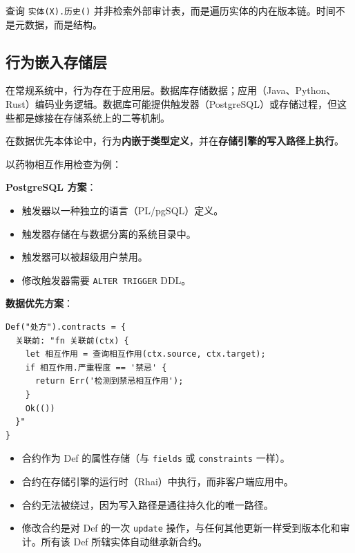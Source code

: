 \documentclass[11pt,a4paper]{ctexart}
\begin{document}
查询 \texttt{实体(X).历史()}
并非检索外部审计表，而是遍历实体的内在版本链。时间不是元数据，而是结构。

\subsection{行为嵌入存储层}\label{ux884cux4e3aux5d4cux5165ux5b58ux50a8ux5c42}

在常规系统中，行为存在于应用层。数据库存储数据；应用（Java、Python、Rust）编码业务逻辑。数据库可能提供触发器（PostgreSQL）或存储过程，但这些都是嫁接在存储系统上的二等机制。

在数据优先本体论中，行为\textbf{内嵌于类型定义}，并在\textbf{存储引擎的写入路径上执行}。

以药物相互作用检查为例：

\textbf{PostgreSQL 方案}：

\begin{Shaded}
\begin{Highlighting}[]
 
  
  
 
\end{Highlighting}
\end{Shaded}

\begin{itemize}
\tightlist
\item
  触发器以一种独立的语言（PL/pgSQL）定义。
\item
  触发器存储在与数据分离的系统目录中。
\item
  触发器可以被超级用户禁用。
\item
  修改触发器需要 \texttt{ALTER\ TRIGGER} DDL。
\end{itemize}

\textbf{数据优先方案}：

\begin{verbatim}
Def("处方").contracts = {
  关联前: "fn 关联前(ctx) { 
    let 相互作用 = 查询相互作用(ctx.source, ctx.target);
    if 相互作用.严重程度 == '禁忌' {
      return Err('检测到禁忌相互作用');
    }
    Ok(())
  }"
}
\end{verbatim}

\begin{itemize}
\tightlist
\item
  合约作为 Def 的属性存储（与 \texttt{fields} 或 \texttt{constraints}
  一样）。
\item
  合约在存储引擎的运行时（Rhai）中执行，而非客户端应用中。
\item
  合约无法被绕过，因为写入路径是通往持久化的唯一路径。
\item
  修改合约是对 Def 的一次 \texttt{update}
  操作，与任何其他更新一样受到版本化和审计。所有该 Def
  所辖实体自动继承新合约。
\end{itemize}
\end{document}
